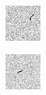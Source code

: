 \begin{figure}[!h]
\begin{subfigure}[t]{.23\textwidth}
        \includegraphics[width=\textwidth]{images/trackB.png}
    \end{subfigure}
    \begin{subfigure}[t]{.23\textwidth}
        \centering
        \includegraphics[width=\textwidth]{images/trackC.png}

\end{subfigure}
\end{figure}
